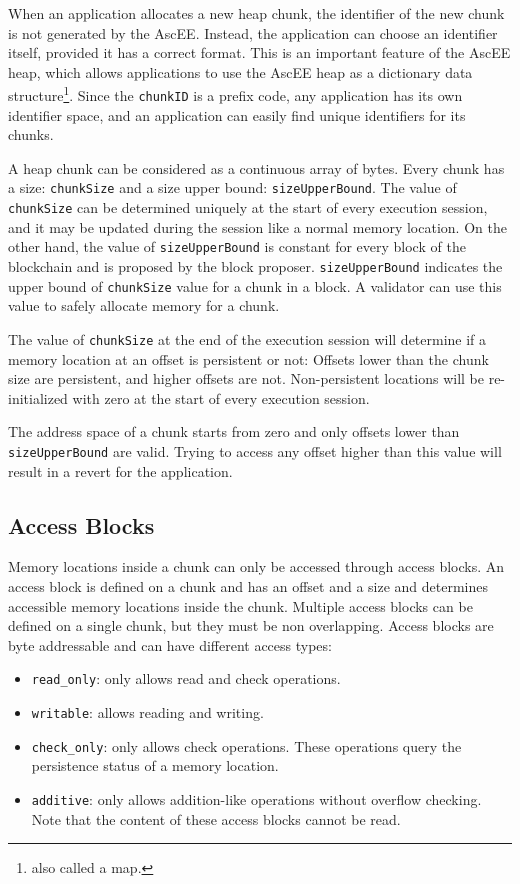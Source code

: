 When an application allocates a new heap chunk, the identifier of the new chunk is not generated by
the AscEE. Instead, the application can choose an identifier itself, provided it has a correct format. This
is an important feature of the AscEE heap, which allows applications to use the AscEE heap as a dictionary
data structure\footnote{also called a map.}.
Since the \texttt{chunkID} is a prefix code, any application has its own identifier space, and an application
can easily find unique identifiers for its chunks.

A heap chunk can be considered as a continuous
array of bytes. Every chunk has a size: \texttt{chunkSize} and a size upper bound: \texttt{sizeUpperBound}. The value of
\texttt{chunkSize} can be determined uniquely at
the start of
every execution session, and it may be updated during the session like a normal memory location. On the other hand,
the value of \texttt{sizeUpperBound} is constant for every block of the blockchain and is proposed by the block
proposer. \texttt{sizeUpperBound} indicates the upper bound of \texttt{chunkSize} value for a chunk in a block.
A validator can use this value to safely allocate memory for a chunk.

The value of \texttt{chunkSize} at the end of the execution session will determine if a memory location at an
offset is persistent or not: Offsets lower than the chunk size are persistent, and higher offsets are not.
Non-persistent locations will be re-initialized with zero at the start of every execution session.

The address space of a chunk starts from zero and only offsets lower than \texttt{sizeUpperBound} are valid. Trying to
access any offset higher than this value will result in a revert for the application.

\subsection{Access Blocks}\label{subsec:access-blocks}

Memory locations inside a chunk can only be accessed through access blocks. An access block is defined on a chunk
and has an offset and a size and determines accessible memory locations inside the chunk. Multiple access blocks can
be defined on a single chunk, but they must be non overlapping. Access blocks are byte addressable and can have
different access types:

\begin{itemize}
    \item \texttt{read\_only}: only allows read and check operations.
    \item \texttt{writable}: allows reading and writing.
    \item \texttt{check\_only}: only allows check operations. These operations query the persistence
    status of a memory location.
    \item \texttt{additive}: only allows addition-like operations without overflow checking. Note that the content of
    these access blocks cannot be read.
\end{itemize}

